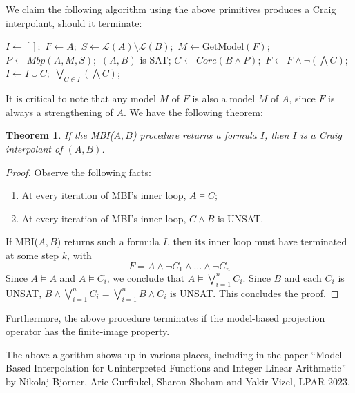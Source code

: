 \documentclass[11pt]{article}
\theoremstyle{plain}
\newtheorem{theorem}{Theorem}
\theoremstyle{definition}
\theoremstyle{remark}
\begin{document}
We claim the following algorithm using the above primitives produces a Craig interpolant, should it terminate:

\begin{algorithmic}
        \State $I \gets [];$
        \State $F\gets A;$
        \State $S \gets \mathcal{L}(A)\setminus \mathcal{L}(B);$
            \State $M \gets \text{GetModel}(F);$
            \State $P \gets Mbp(A,M,S);$
                \Return $(A, B)$ is SAT;
            \Else 
                \State $C \gets Core(B \wedge P);$
                \State $F \gets F \wedge \neg (\bigwedge C);$
                \State $I \gets I \cup C;$
                \EndIf
        \EndWhile 
        \Return $\bigvee_{C \in I} (\bigwedge C)$;
    \EndProcedure 
\end{algorithmic}

It is critical to note that any model $M$ of $F$ is also a model $M$ of $A$, since $F$ is always a strengthening of $A$. We have the following theorem:

\begin{theorem}
    If the MBI($A, B$) procedure returns a formula $I$, then $I$ is a Craig interpolant of $(A, B)$.
\end{theorem}

\begin{proof}
Observe the following facts:
\begin{enumerate}
    \item At every iteration of MBI's inner loop, $A \vDash C$;
    \item At every iteration of MBI's inner loop, $C \wedge B$ is UNSAT.
\end{enumerate}

    If MBI($A, B$) returns such a formula $I$, then its inner loop must have terminated at some step $k$, with
    \[
    F = A \wedge \neg C_1 \wedge \dots \wedge\neg C_n
    \]
    Since $A \vDash A$ and $A \vDash C_i$, we conclude that $A \vDash \bigvee_{i=1}^n C_i$. Since $B$ and each $C_i$ is UNSAT, $B \wedge \bigvee_{i=1}^nC_i = \bigvee_{i=1}^n B \wedge C_i$ is UNSAT. This concludes the proof.
\end{proof}

Furthermore, the above procedure terminates if the model-based projection operator has the finite-image property.

The above algorithm shows up in various places, including in the paper ``Model Based Interpolation for Uninterpreted
Functions and Integer Linear Arithmetic'' by Nikolaj Bjorner, Arie Gurfinkel, Sharon Shoham and Yakir Vizel, LPAR 2023.
\end{document}
